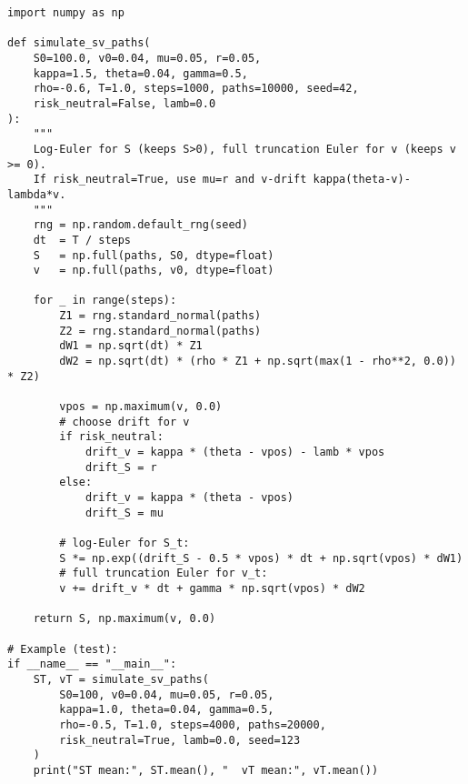 \documentclass[11pt]{article}
\begin{document}
\begin{lstlisting}[style=py,caption={Stochastic volatility (CIR-type variance) with correlated Brownian motions}]
import numpy as np

def simulate_sv_paths(
    S0=100.0, v0=0.04, mu=0.05, r=0.05,
    kappa=1.5, theta=0.04, gamma=0.5,
    rho=-0.6, T=1.0, steps=1000, paths=10000, seed=42,
    risk_neutral=False, lamb=0.0
):
    """
    Log-Euler for S (keeps S>0), full truncation Euler for v (keeps v >= 0).
    If risk_neutral=True, use mu=r and v-drift kappa(theta-v)-lambda*v.
    """
    rng = np.random.default_rng(seed)
    dt  = T / steps
    S   = np.full(paths, S0, dtype=float)
    v   = np.full(paths, v0, dtype=float)

    for _ in range(steps):
        Z1 = rng.standard_normal(paths)
        Z2 = rng.standard_normal(paths)
        dW1 = np.sqrt(dt) * Z1
        dW2 = np.sqrt(dt) * (rho * Z1 + np.sqrt(max(1 - rho**2, 0.0)) * Z2)

        vpos = np.maximum(v, 0.0)
        # choose drift for v
        if risk_neutral:
            drift_v = kappa * (theta - vpos) - lamb * vpos
            drift_S = r
        else:
            drift_v = kappa * (theta - vpos)
            drift_S = mu

        # log-Euler for S_t:
        S *= np.exp((drift_S - 0.5 * vpos) * dt + np.sqrt(vpos) * dW1)
        # full truncation Euler for v_t:
        v += drift_v * dt + gamma * np.sqrt(vpos) * dW2

    return S, np.maximum(v, 0.0)

# Example (test):
if __name__ == "__main__":
    ST, vT = simulate_sv_paths(
        S0=100, v0=0.04, mu=0.05, r=0.05,
        kappa=1.0, theta=0.04, gamma=0.5,
        rho=-0.5, T=1.0, steps=4000, paths=20000,
        risk_neutral=True, lamb=0.0, seed=123
    )
    print("ST mean:", ST.mean(), "  vT mean:", vT.mean())
\end{lstlisting}
\end{document}
